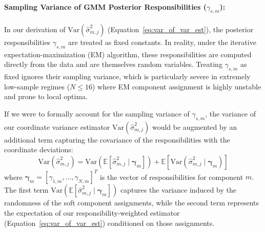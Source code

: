 \documentclass{article}
\theoremstyle{plain}
\theoremstyle{definition}
\theoremstyle{remark}
\begin{document}
\paragraph{Sampling Variance of GMM Posterior Responsibilities ($\gamma_{s, m}$):}
In our derivation of $\text{Var}(\hat{\sigma}^2_{m, j})$ (Equation~\ref{eq:var_of_var_est}), the posterior responsibilities $\gamma_{s, m}$ are treated as fixed constants. In reality, under the iterative expectation-maximization (EM) algorithm, these responsibilities are computed directly from the data and are themselves random variables. Treating $\gamma_{s, m}$ as fixed ignores their sampling variance, which is particularly severe in extremely low-sample regimes ($N \le 16$) where EM component assignment is highly unstable and prone to local optima.

If we were to formally account for the sampling variance of $\gamma_{s, m}$, the variance of our coordinate variance estimator $\text{Var}(\hat{\sigma}^2_{m, j})$ would be augmented by an additional term capturing the covariance of the responsibilities with the coordinate deviations:
\begin{equation}
\label{eq:sampling_variance}
    \text{Var}(\hat{\sigma}^2_{m, j}) = \text{Var}\left( \mathbb{E}[\hat{\sigma}^2_{m, j} \mid \boldsymbol{\gamma}_m] \right) + \mathbb{E}\left[ \text{Var}(\hat{\sigma}^2_{m, j} \mid \boldsymbol{\gamma}_m) \right]
\end{equation}
where $\boldsymbol{\gamma}_m = [\gamma_{1, m}, \dots, \gamma_{N, m}]^T$ is the vector of responsibilities for component $m$. The first term $\text{Var}\left( \mathbb{E}[\hat{\sigma}^2_{m, j} \mid \boldsymbol{\gamma}_m] \right)$ captures the variance induced by the randomness of the soft component assignments, while the second term represents the expectation of our responsibility-weighted estimator (Equation~\ref{eq:var_of_var_est}) conditioned on those assignments. 
\end{document}
